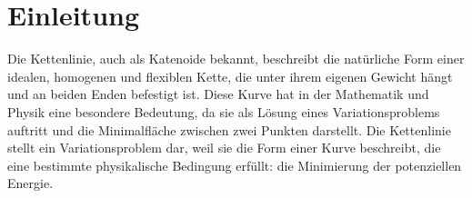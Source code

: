 %
%
%
%
\section{Einleitung\label{kettenlinie:section:Einleitung}}
Die Kettenlinie, auch als Katenoide bekannt, beschreibt die natürliche Form einer idealen, homogenen und flexiblen Kette, die unter ihrem eigenen Gewicht hängt und an beiden Enden befestigt ist.
Diese Kurve hat in der Mathematik und Physik eine besondere Bedeutung, da sie als Lösung eines Variationsproblems auftritt und die Minimalfläche zwischen zwei Punkten darstellt.
Die Kettenlinie stellt ein Variationsproblem dar, weil sie die Form einer Kurve beschreibt, die eine bestimmte physikalische Bedingung erfüllt: die Minimierung der potenziellen Energie. 

